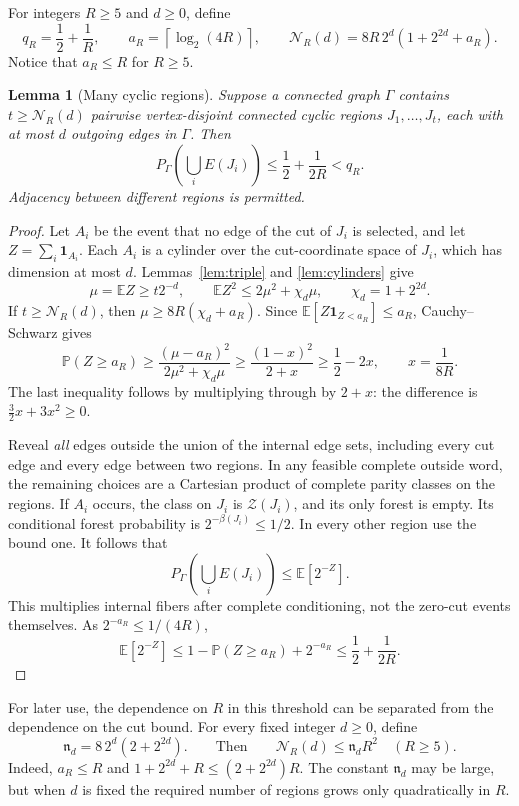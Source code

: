 \documentclass[11pt,a4paper]{article}
\numberwithin{equation}{section}
\newtheorem{lemma}[theorem]{Lemma}
\theoremstyle{definition}
\theoremstyle{remark}
\newcommand{\cZ}{\mathcal Z}
\newcommand{\E}{\mathbb E}
\newcommand{\Prob}{\mathbb P}
\newcommand{\ind}{\mathbf 1}
\newcommand{\ceil}[1]{\left\lceil#1\right\rceil}
\begin{document}
For integers $R\ge5$ and $d\ge0$, define
\begin{equation}\label{eq:moving-count}
 q_R=\frac12+\frac1R,\qquad a_R=\ceil{\log_2(4R)},\qquad
 \mathcal N_R(d)=8R\,2^d(1+2^{2d}+a_R).
\end{equation}
Notice that $a_R\le R$ for $R\ge5$.

\begin{lemma}[Many cyclic regions]\label{lem:many-regions}
Suppose a connected graph $\Gamma$ contains $t\ge\mathcal N_R(d)$ pairwise vertex-disjoint connected cyclic regions $J_1,\ldots,J_t$, each with at most $d$ outgoing edges in $\Gamma$. Then
\[
 P_\Gamma\left(\bigcup_i E(J_i)\right)\le\frac12+\frac1{2R}<q_R.
\]
Adjacency between different regions is permitted.
\end{lemma}
\begin{proof}
Let $A_i$ be the event that no edge of the cut of $J_i$ is selected, and let $Z=\sum_i\ind_{A_i}$. Each $A_i$ is a cylinder over the cut-coordinate space of $J_i$, which has dimension at most $d$. Lemmas~\ref{lem:triple} and \ref{lem:cylinders} give
\[
 \mu=\E Z\ge t2^{-d},\qquad
 \E Z^2\le2\mu^2+\chi_d\mu,\qquad \chi_d=1+2^{2d}.
\]
If $t\ge \mathcal N_R(d)$, then $\mu\ge8R(\chi_d+a_R)$. Since
$\E[Z\ind_{Z<a_R}]\le a_R$, Cauchy--Schwarz gives
\[
 \Prob(Z\ge a_R)\ge\frac{(\mu-a_R)^2}{2\mu^2+\chi_d\mu}
 \ge\frac{(1-x)^2}{2+x}\ge\frac12-2x,
 \qquad x=\frac1{8R}.
\]
The last inequality follows by multiplying through by $2+x$: the difference is $\tfrac32x+3x^2\ge0$.

Reveal \emph{all} edges outside the union of the internal edge sets, including every cut edge and every edge between two regions. In any feasible complete outside word, the remaining choices are a Cartesian product of complete parity classes on the regions. If $A_i$ occurs, the class on $J_i$ is $\cZ(J_i)$, and its only forest is empty. Its conditional forest probability is $2^{-\beta(J_i)}\le1/2$. In every other region use the bound one. It follows that
\begin{equation}\label{eq:conditional-product}
 P_\Gamma\left(\bigcup_i E(J_i)\right)\le\E[2^{-Z}].
\end{equation}
This multiplies internal fibers after complete conditioning, not the zero-cut events themselves. As $2^{-a_R}\le1/(4R)$,
\[
 \E[2^{-Z}]\le1-\Prob(Z\ge a_R)+2^{-a_R}
 \le\frac12+\frac1{2R}.
\]
\end{proof}


For later use, the dependence on $R$ in this threshold can be separated from the dependence on the cut bound. For every fixed integer $d\ge0$, define
\begin{equation}\label{eq:fixed-cut-count}
 \mathfrak n_d=8\,2^d(2+2^{2d}).
 \qquad\text{Then}\qquad
 \mathcal N_R(d)\le \mathfrak n_d R^2\quad(R\ge5).
\end{equation}
Indeed, $a_R\le R$ and $1+2^{2d}+R\le(2+2^{2d})R$. The constant $\mathfrak n_d$ may be large, but when $d$ is fixed the required number of regions grows only quadratically in $R$.
\end{document}
